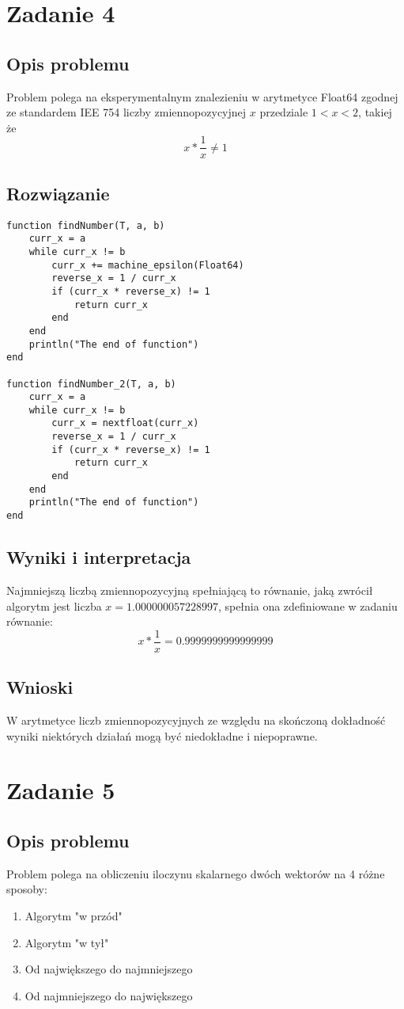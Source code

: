 \documentclass[11pt]{article}
\begin{document}
\section{Zadanie 4}
\subsection{Opis problemu}
Problem polega na eksperymentalnym znalezieniu w arytmetyce Float64 zgodnej ze standardem IEE 754 liczby zmiennopozycyjnej $x$ przedziale $1 < x < 2$, takiej że 
$$x*\frac{1}{x} \neq 1$$
\subsection{Rozwiązanie}
\begin{verbatim}
function findNumber(T, a, b)
    curr_x = a
    while curr_x != b
        curr_x += machine_epsilon(Float64)
        reverse_x = 1 / curr_x
        if (curr_x * reverse_x) != 1
            return curr_x
        end
    end
    println("The end of function")
end

function findNumber_2(T, a, b)
    curr_x = a
    while curr_x != b
        curr_x = nextfloat(curr_x)
        reverse_x = 1 / curr_x
        if (curr_x * reverse_x) != 1
            return curr_x
        end
    end
    println("The end of function")
end
\end{verbatim}
\subsection{Wyniki i interpretacja}
Najmniejszą liczbą zmiennopozycyjną spełniającą to równanie, jaką zwrócił algorytm jest liczba $x = 1.000000057228997$, spełnia ona zdefiniowane w zadaniu równanie:
$$x*\frac{1}{x} = 0.9999999999999999$$
\subsection{Wnioski}
W arytmetyce liczb zmiennopozycyjnych ze względu na skończoną dokładność wyniki niektórych działań mogą być niedokładne i niepoprawne.

\section{Zadanie 5}
\subsection{Opis problemu}
Problem polega na obliczeniu iloczynu skalarnego dwóch wektorów na 4 różne sposoby:
\begin{enumerate}
    \item Algorytm "w przód"
    \item Algorytm "w tył"
    \item Od największego do najmniejszego
    \item Od najmniejszego do największego
\end{enumerate}
\end{document}
